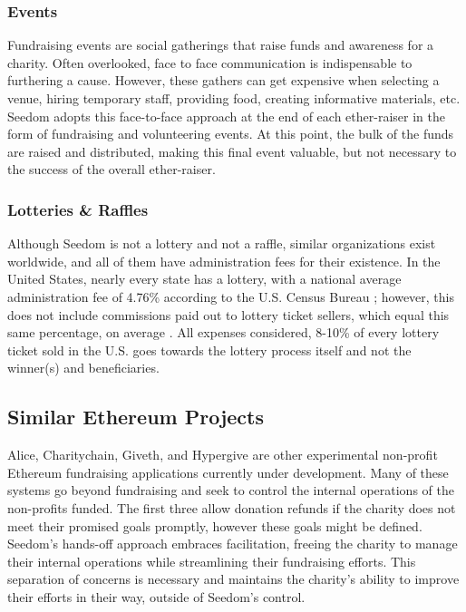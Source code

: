 \documentclass[11pt]{article}
\begin{document}
\subsubsection{Events}

Fundraising events are social gatherings that raise funds and awareness for a charity. Often overlooked, face to face communication is indispensable to furthering a cause. However, these gathers can get expensive when selecting a venue, hiring temporary staff, providing food, creating informative materials, etc. Seedom adopts this face-to-face approach at the end of each ether-raiser in the form of fundraising and volunteering events. At this point, the bulk of the funds are raised and distributed, making this final event valuable, but not necessary to the success of the overall ether-raiser.

\subsubsection{Lotteries \& Raffles}

Although Seedom is not a lottery and not a raffle, similar organizations exist worldwide, and all of them have administration fees for their existence. In the United States, nearly every state has a lottery, with a national average administration fee of 4.76\% according to the U.S. Census Bureau \cite{3}; however, this does not include commissions paid out to lottery ticket sellers, which equal this same percentage, on average \cite{4}. All expenses considered, 8-10\% of every lottery ticket sold in the U.S. goes towards the lottery process itself and not the winner(s) and beneficiaries.

\subsection{Similar Ethereum Projects}

Alice, Charitychain, Giveth, and Hypergive are other experimental non-profit Ethereum fundraising applications currently under development. Many of these systems go beyond fundraising and seek to control the internal operations of the non-profits funded. The first three allow donation refunds if the charity does not meet their promised goals promptly, however these goals might be defined. Seedom's hands-off approach embraces facilitation, freeing the charity to manage their internal operations while streamlining their fundraising efforts. This separation of concerns is necessary and maintains the charity's ability to improve their efforts in their way, outside of Seedom's control.
\end{document}
